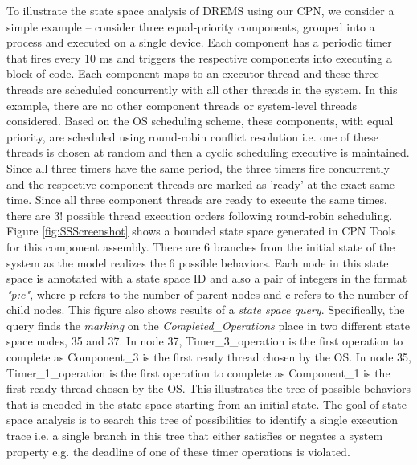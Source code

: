 To illustrate the state space analysis of DREMS using our CPN, we consider a simple example -- consider three equal-priority components, grouped into a process and executed on a single device. Each component has a periodic timer that fires every 10 ms and triggers the respective components into executing a block of code. Each component maps to an executor thread and these three threads are scheduled concurrently with all other threads in the system. In this example, there are no other component threads or system-level threads considered. Based on the OS scheduling scheme, these components, with equal priority, are scheduled using round-robin conflict resolution i.e. one of these threads is chosen at random and then a cyclic scheduling executive is maintained. Since all three timers have the same period, the three timers fire concurrently and the respective component threads are marked as 'ready' at the exact same time. Since all three component threads are ready to execute the same times, there are $3!$ possible thread execution orders following round-robin scheduling. Figure \ref{fig:SSScreenshot} shows a bounded state space generated in CPN Tools for this component assembly. There are 6 branches from the initial state of the system as the model realizes the 6 possible behaviors. Each node in this state space is annotated with a state space ID and also a pair of integers in the format \emph{"p:c"}, where p refers to the number of parent nodes and c refers to the number of child nodes. This figure also shows results of a \emph{state space query}. Specifically, the query finds the \emph{marking} on the \emph{Completed\_Operations} place in two different state space nodes, 35 and 37. In node 37, Timer\_3\_operation is the first operation to complete as Component\_3 is the first ready thread chosen by the OS. In node 35, Timer\_1\_operation is the first operation to complete as Component\_1 is the first ready thread chosen by the OS. This illustrates the tree of possible behaviors that is encoded in the state space starting from an initial state. The goal of state space analysis is to search this tree of possibilities to identify a single execution trace i.e. a single branch in this tree that either satisfies or negates a system property e.g. the deadline of one of these timer operations is violated. 


